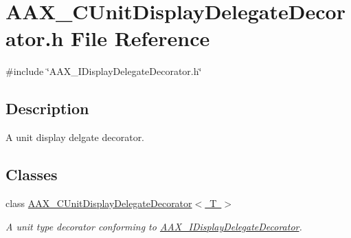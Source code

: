\hypertarget{a00482}{}\section{A\+A\+X\+\_\+\+C\+Unit\+Display\+Delegate\+Decorator.\+h File Reference}
\label{a00482}
{\ttfamily \#include \char`\"{}A\+A\+X\+\_\+\+I\+Display\+Delegate\+Decorator.\+h\char`\"{}}\newline


\subsection{Description}
A unit display delgate decorator. 

\subsection*{Classes}
\begin{DoxyCompactItemize}
\item 
class \mbox{\hyperlink{a01585}{A\+A\+X\+\_\+\+C\+Unit\+Display\+Delegate\+Decorator$<$ T $>$}}
\begin{DoxyCompactList}\small\item\em A unit type decorator conforming to \mbox{\hyperlink{a01805}{A\+A\+X\+\_\+\+I\+Display\+Delegate\+Decorator}}. \end{DoxyCompactList}\end{DoxyCompactItemize}
